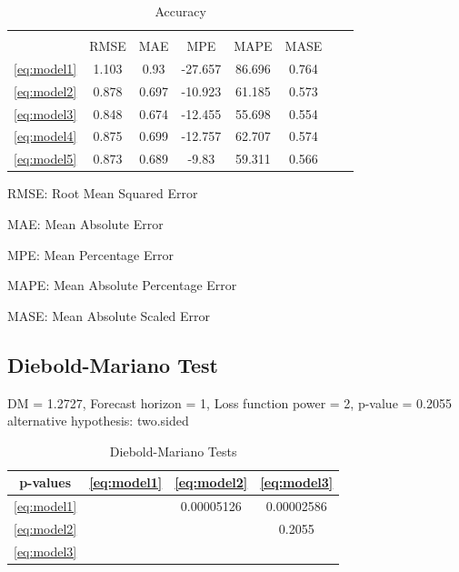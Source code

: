 \documentclass[12pt,a4paper,oneside]{book}
\begin{document}
\begin{table}[!htbp]
    \centering \footnotesize
\begin{tabular}{@{\extracolsep{5pt}} cccccccc} 
\\[-1.8ex]\hline 
\hline \\[-1.8ex] 
                 & RMSE & MAE & MPE & MAPE & MASE \\ \hline
\autoref{eq:model1} & 1.103 &0.93 &-27.657 & 86.696 & 0.764 \\
\autoref{eq:model2} & 0.878 &0.697 & -10.923 & 61.185 & 0.573 \\
\autoref{eq:model3} & 0.848 &0.674 & -12.455 & 55.698 & 0.554 \\
\autoref{eq:model4} & 0.875 &0.699 & -12.757 & 62.707 & 0.574 \\
\autoref{eq:model5} & 0.873 &0.689 & -9.83 & 59.311 & 0.566 \\ \hline
    \end{tabular}
    \caption{Accuracy}
    \label{tab:accuracy measures}
\end{table}


RMSE: Root Mean Squared Error

MAE: Mean Absolute Error

MPE: Mean Percentage Error

MAPE: Mean Absolute Percentage Error

MASE: Mean Absolute Scaled Error

\subsection{Diebold-Mariano Test}

\cite{diebold_comparing_1995}

DM = 1.2727, Forecast horizon = 1, Loss function power = 2, p-value = 0.2055
alternative hypothesis: two.sided


\begin{table}[!htbp]
    \centering \footnotesize
    \begin{tabular}{c|c|c|c}
        p-values & \autoref{eq:model1} & \autoref{eq:model2} & \autoref{eq:model3} \\ \hline
        \autoref{eq:model1} &    & 0.00005126  & 0.00002586    \\
        \autoref{eq:model2} &    &        & 0.2055        \\
        \autoref{eq:model3} &    &        &      \\
    \end{tabular}
    \caption{Diebold-Mariano Tests}
    \label{tab:Diebold-Mariano}
\end{table}
\end{document}
